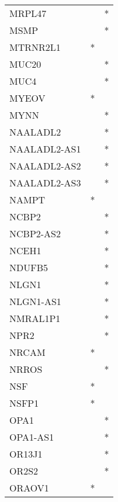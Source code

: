 \begin{longtable}{lcc}
MRPL47           &                &          * \\
MSMP             &                &          * \\
MTRNR2L1         &              * &            \\
MUC20            &                &          * \\
MUC4             &                &          * \\
MYEOV            &              * &            \\
MYNN             &                &          * \\
NAALADL2         &                &          * \\
NAALADL2-AS1     &                &          * \\
NAALADL2-AS2     &                &          * \\
NAALADL2-AS3     &                &          * \\
NAMPT            &              * &            \\
NCBP2            &                &          * \\
NCBP2-AS2        &                &          * \\
NCEH1            &                &          * \\
NDUFB5           &                &          * \\
NLGN1            &                &          * \\
NLGN1-AS1        &                &          * \\
NMRAL1P1         &                &          * \\
NPR2             &                &          * \\
NRCAM            &              * &            \\
NRROS            &                &          * \\
NSF              &              * &            \\
NSFP1            &              * &            \\
OPA1             &                &          * \\
OPA1-AS1         &                &          * \\
OR13J1           &                &          * \\
OR2S2            &                &          * \\
ORAOV1           &              * &            \\

\end{longtable}
